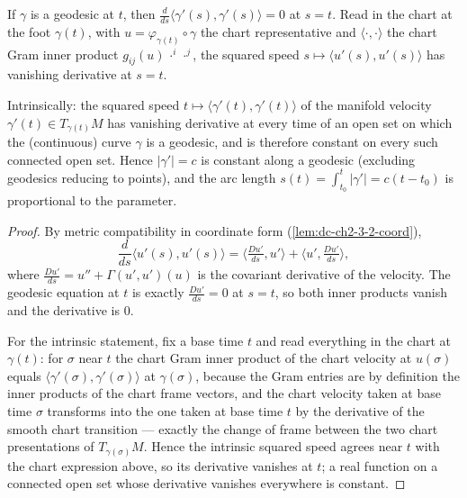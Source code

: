 \begin{lemma}
  \label{lem:dc-ch3-2-1-constspeed}


  If $\gamma$ is a geodesic at $t$, then
  $\frac{d}{ds}\big\langle\gamma'(s),\gamma'(s)\big\rangle=0$ at $s=t$. Read in
  the chart at the foot $\gamma(t)$, with $u=\varphi_{\gamma(t)}\circ\gamma$ the
  chart representative and $\langle\cdot,\cdot\rangle$ the chart Gram inner
  product $g_{ij}(u)\,\cdot^i\,\cdot^j$, the squared speed
  $s\mapsto\langle u'(s),u'(s)\rangle$ has vanishing derivative at $s=t$.

  Intrinsically: the squared speed
  $t\mapsto\langle\gamma'(t),\gamma'(t)\rangle$ of the manifold velocity
  $\gamma'(t)\in T_{\gamma(t)}M$ has vanishing derivative at every time of an
  open set on which the (continuous) curve $\gamma$ is a geodesic, and is
  therefore constant on every such connected open set. Hence $|\gamma'|=c$ is
  constant along a geodesic (excluding geodesics reducing to points), and the
  arc length $s(t)=\int_{t_0}^t|\gamma'|=c(t-t_0)$ is proportional to the
  parameter.
\end{lemma}
\begin{proof}
  \sketch

  By metric compatibility in coordinate form
  (\cref{lem:dc-ch2-3-2-coord}),
  $$
  \frac{d}{ds}\big\langle u'(s),u'(s)\big\rangle
    =\Big\langle\tfrac{Du'}{ds},u'\Big\rangle+\Big\langle u',\tfrac{Du'}{ds}\Big\rangle,
  $$
  where $\frac{Du'}{ds}=u''+\Gamma(u',u')(u)$ is the covariant derivative of the
  velocity. The geodesic equation at $t$ is exactly $\frac{Du'}{ds}=0$ at $s=t$,
  so both inner products vanish and the derivative is $0$.

  For the intrinsic statement, fix a base time $t$ and read everything in the
  chart at $\gamma(t)$: for $\sigma$ near $t$ the chart Gram inner product of
  the chart velocity at $u(\sigma)$ equals
  $\langle\gamma'(\sigma),\gamma'(\sigma)\rangle$ at $\gamma(\sigma)$, because
  the Gram entries are by definition the inner products of the chart frame
  vectors, and the chart velocity taken at base time $\sigma$ transforms into
  the one taken at base time $t$ by the derivative of the smooth chart
  transition — exactly the change of frame between the two chart
  presentations of $T_{\gamma(\sigma)}M$. Hence the intrinsic squared speed
  agrees near $t$ with the chart expression above, so its derivative vanishes
  at $t$; a real function on a connected open set whose derivative vanishes
  everywhere is constant.
\end{proof}

